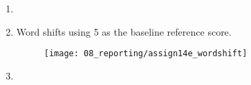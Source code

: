 \begin{enumerate}
\begin{enumerate}
		
		\item 
		
		\item 
		Word shifts using 5 as the baseline reference score.
		
	      	\begin{figure}[H]
		       	\centering
		       	\texttt{[image: 08\_reporting/assign14e\_wordshift]}
		       	\label{fig:wordshift_ref}
	    	\end{figure}

		
		\item 
		
   
		
			

	\end{enumerate}

   \solutionend

\end{enumerate}

